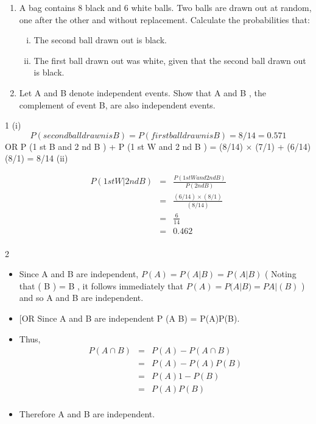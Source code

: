 \documentclass[a4paper,12pt]{article}
\begin{document}
\begin{enumerate}
\item A bag contains 8 black and 6 white balls. Two balls are drawn out at random, one
after the other and without replacement.
Calculate the probabilities that:

\begin{enumerate}[(i)]
\item The second ball drawn out is black.
\item The first ball drawn out was white, given that the second ball drawn out is
black.
\end{enumerate}

\item
Let A and B denote independent events.
Show that A and B , the complement of event B, are also independent events.


\end{enumerate}
\newpage

1
(i)
\[P (second ball drawn is B ) = P (first ball drawn is B ) = 8/14 = 0.571\]
OR P (1 st B and 2 nd B ) + P (1 st W and 2 nd B )
= (8/14) × (7/1) + (6/14) \times (8/1) = 8/14
(ii)

\begin{eqnarray*}
P (1 st W | 2 nd B ) &=& \frac{P (1 st W and 2 nd B )}{ P (2 nd B )} \\  
&=& \frac{ (6/14) \times (8/1) }{ (8/14) } \\
&=& \frac{6}{14} \\  &=& 0.462\\
\end{eqnarray*}

2
\begin{itemize}
\item Since A and B are independent, $P ( A ) = P ( A | B ) = P ( A | B )$
(
Noting that ( B ) = B , it follows immediately that $P ( A ) = P ( A | B ) = P A | ( B )$
)
and so A and B are independent.
\item [OR
Since A and B are independent P (A \cap B) = P(A)P(B).
\item Thus,
\begin{eqnarray*}
P(A \cap B ) &=& P(A) − P(A \cap B) \\ 
&=& P(A) − P(A)P(B) \\ &=& P(A){1 − P(B)} \\ &=& P(A)P( B )
\\
\end{eqnarray*}

\item Therefore A and B are independent.
\end{itemize}
\end{document}
